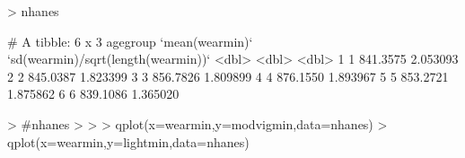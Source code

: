 \documentclass[11pt]{article}
\begin{document}
\begin{Schunk}
\begin{Sinput}
> nhanes %>% group_by(agegroup) %>% summarise(mean(wearmin),sd(wearmin)/sqrt(length(wearmin)))
\end{Sinput}
\begin{Soutput}
# A tibble: 6 x 3
  agegroup `mean(wearmin)` `sd(wearmin)/sqrt(length(wearmin))`
     <dbl>           <dbl>                               <dbl>
1        1        841.3575                            2.053093
2        2        845.0387                            1.823399
3        3        856.7826                            1.809899
4        4        876.1550                            1.893967
5        5        853.2721                            1.875862
6        6        839.1086                            1.365020
\end{Soutput}
\begin{Sinput}
> #nhanes %>% group_by(sex,race,bmigroup) %>% summarise(mean(wearmin),sd(wearmin)/sqrt(length(wearmin)))
> 
> 
> qplot(x=wearmin,y=modvigmin,data=nhanes)
> qplot(x=wearmin,y=lightmin,data=nhanes)
\end{Sinput}
\end{Schunk}
\end{document}
